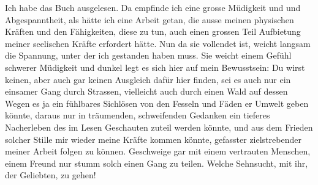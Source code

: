 \def\day{30. Oktober 1942}
\mktitle

Ich habe das Buch ausgelesen.
Da empfinde ich eine grosse M\"{u}digkeit und und Abgespanntheit, als h\"{a}tte ich eine Arbeit getan, die ausse meinen physischen Kr\"{a}ften und den F\"{a}higkeiten, diese zu tun, auch einen grossen Teil Aufbietung meiner seelischen Kr\"{a}fte erfordert h\"{a}tte.
Nun da sie vollendet ist, weicht langsam die Spannung, unter der ich gestanden haben muss.
Sie weicht einem Gef\"{u}hl schwerer M\"{u}digkeit und dunkel legt es sich hier auf mein Bewusstsein: Du wirst keinen, aber auch gar keinen Ausgleich daf\"{u}r hier finden, sei es auch nur ein einsamer Gang durch Strassen, vielleicht auch durch einen Wald auf dessen Wegen es ja ein f\"{u}hlbares Sichl\"{o}sen von den Fesseln und F\"{a}den er Umwelt geben k\"{o}nnte, daraus nur in tr\"{a}umenden, schweifenden Gedanken ein tieferes Nacherleben des im Lesen Geschauten zuteil werden k\"{o}nnte, und aus dem Frieden solcher Stille mir wieder meine Kr\"{a}fte kommen k\"{o}nnte, gefasster zielstrebender meiner Arbeit folgen zu k\"{o}nnen.
Geschweige gar mit einem vertrauten Menschen, einem Freund nur stumm solch einen Gang zu teilen.
Welche Sehnsucht, mit ihr, der Geliebten, zu gehen!

\clearpage
